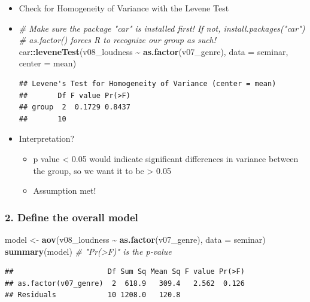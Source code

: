 \documentclass[
]{book}
\newenvironment{Shaded}{\begin{snugshade}}{\end{snugshade}}
\newcommand{\AttributeTok}[1]{\textcolor[rgb]{0.13,0.29,0.53}{#1}}
\newcommand{\CommentTok}[1]{\textcolor[rgb]{0.56,0.35,0.01}{\textit{#1}}}
\newcommand{\FunctionTok}[1]{\textcolor[rgb]{0.13,0.29,0.53}{\textbf{#1}}}
\newcommand{\NormalTok}[1]{#1}
\newcommand{\OtherTok}[1]{\textcolor[rgb]{0.56,0.35,0.01}{#1}}
\newcommand{\SpecialCharTok}[1]{\textcolor[rgb]{0.81,0.36,0.00}{\textbf{#1}}}
\providecommand{\tightlist}{%
  \setlength{\itemsep}{0pt}\setlength{\parskip}{0pt}}
\begin{document}
\begin{itemize}
\item
  Check for Homogeneity of Variance with the Levene Test
\item
\begin{Shaded}
\begin{Highlighting}[]
\CommentTok{\# Make sure the package "car" is installed first! If not, install.packages("car")}
\CommentTok{\# as.factor() forces R to recognize our group as such!}
\NormalTok{car}\SpecialCharTok{::}\FunctionTok{leveneTest}\NormalTok{(v08\_loudness }\SpecialCharTok{\textasciitilde{}} \FunctionTok{as.factor}\NormalTok{(v07\_genre), }\AttributeTok{data =}\NormalTok{ seminar, }\AttributeTok{center =}\NormalTok{ mean)}
\end{Highlighting}
\end{Shaded}

\begin{verbatim}
## Levene's Test for Homogeneity of Variance (center = mean)
##       Df F value Pr(>F)
## group  2  0.1729 0.8437
##       10
\end{verbatim}
\item
  Interpretation?

  \begin{itemize}
  \tightlist
  \item
    p value \textless{} 0.05 would indicate significant differences in variance between the group, so we want it to be \textgreater{} 0.05
  \item
    Assumption met!
  \end{itemize}
\end{itemize}

\subsubsection{2. Define the overall model}\label{define-the-overall-model}

\begin{Shaded}
\begin{Highlighting}[]
\NormalTok{model }\OtherTok{\textless{}{-}} \FunctionTok{aov}\NormalTok{(v08\_loudness }\SpecialCharTok{\textasciitilde{}} \FunctionTok{as.factor}\NormalTok{(v07\_genre), }\AttributeTok{data =}\NormalTok{ seminar)}
\FunctionTok{summary}\NormalTok{(model) }\CommentTok{\# "Pr(\textgreater{}F)" is the p{-}value}
\end{Highlighting}
\end{Shaded}

\begin{verbatim}
##                      Df Sum Sq Mean Sq F value Pr(>F)
## as.factor(v07_genre)  2  618.9   309.4   2.562  0.126
## Residuals            10 1208.0   120.8
\end{verbatim}
\end{document}
